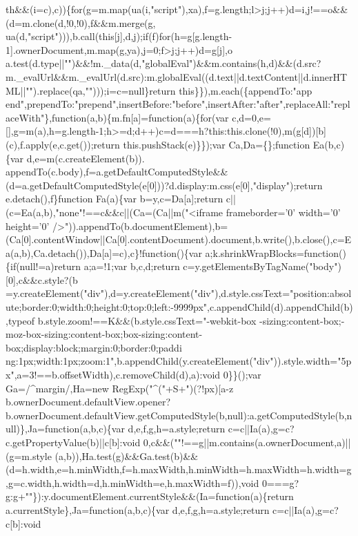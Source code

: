 \begin{DoxyCode}
{      th&&(i=c),c))\{for(g=m.map(ua(i,"script"),xa),f=g.length;l>j;j++)d=i,j!==o&&(d=m.clone(d,!0,!0),f&&m.merge(g,
      ua(d,"script"))),b.call(this[j],d,j);if(f)for(h=g[g.length-1].ownerDocument,m.map(g,ya),j=0;f>j;j++)d=g[j],o
      a.test(d.type||"")&&!m.\_data(d,"globalEval")&&m.contains(h,d)&&(d.src?m.\_evalUrl&&m.\_evalUrl(d.src):m.globalEval((d.text||d.textContent||d.innerHTML||"").replace(qa,"")));i=c=null\}return
       this\}\}),m.each(\{appendTo:"app
      end",prependTo:"prepend",insertBefore:"before",insertAfter:"after",replaceAll:"replaceWith"\},function(a,b)\{m.fn[a]=function(a)\{for(var
       c,d=0,e=[],g=m(a),h=g.length-1;h>=d;d++)c=d===h?this:this.clone(!0),m(g[d])[b](c),f.apply(e,c.get());return this.pushStack(e)\}\});var Ca,Da=\{\};function Ea(b,c)\{var
       d,e=m(c.createElement(b)).
      appendTo(c.body),f=a.getDefaultComputedStyle&&(d=a.getDefaultComputedStyle(e[0]))?d.display:m.css(e[0],"display");return e.detach(),f\}function Fa(a)\{var b=y,c=Da[a];return
       c||(c=Ea(a,b),"none"!==c&&c||(Ca=(Ca||m("<iframe frameborder='}0\textcolor{stringliteral}{' width='}0\textcolor{stringliteral}{' height='}0\textcolor{stringliteral}{'
      />")).appendTo(b.documentElement),b=(Ca[0].contentWindow||Ca[0].contentDocument).document,b.write(),b.close(),c=Ea(a,b),Ca.detach()),Da[a]=c),c\}!function()\{var
       a;k.shrinkWrapBlocks=function()\{if(null!=a)return a;a=!1;var b,c,d;return
       c=y.getElementsByTagName("body")[0],c&&c.style?(b
      =y.createElement("div"),d=y.createElement("div"),d.style.cssText="position:absolute;border:0;width:0;height:0;top:0;left:-9999px",c.appendChild(d).appendChild(b),typeof
       b.style.zoom!==K&&(b.style.cssText="-webkit-box
      -sizing:content-box;-moz-box-sizing:content-box;box-sizing:content-box;display:block;margin:0;border:0;paddi
      ng:1px;width:1px;zoom:1",b.appendChild(y.createElement("div")).style.width="5px",a=3!==b.offsetWidth),c.removeChild(d),a):void 0\}\}();var Ga=/^margin/,Ha=new
       RegExp("^("+S+")(?!px)[a-z%
       b.ownerDocument.defaultView.opener?b.ownerDocument.defaultView.getComputedStyle(b,null):a.getComputedStyle(b,null)\},Ja=function(a,b,c)\{var
       d,e,f,g,h=a.style;return c=c||Ia(a),g=c?c.getPropertyValue(b)||c[b]:void
       0,c&&(""!==g||m.contains(a.ownerDocument,a)||(g=m.style
      (a,b)),Ha.test(g)&&Ga.test(b)&&(d=h.width,e=h.minWidth,f=h.maxWidth,h.minWidth=h.maxWidth=h.width=g,g=c.width,h.width=d,h.minWidth=e,h.maxWidth=f)),void
       0===g?g:g+""\}):y.documentElement.currentStyle&&(Ia=function(a)\{return a.currentStyle\},Ja=function(a,b,c)\{var d,e,f,g,h=a.style;return c=c||Ia(a),g=c?c[b]:void
}
\end{DoxyCode}

